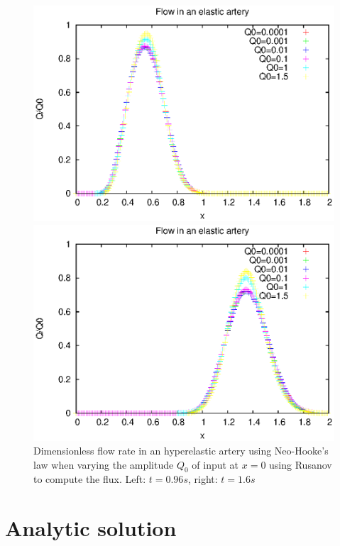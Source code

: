 \documentclass{config}
\begin{document}
\begin{figure}[H]
   \begin{minipage}[c]{.46\linewidth}
     \includegraphics[scale=0.7]{figures/Q_NH_t1.eps}
   \end{minipage} \hfill
   \begin{minipage}[c]{.46\linewidth}
\includegraphics[scale=0.7]{figures/Q_NH_t2.eps}
   \end{minipage}
   \caption{Dimensionless flow rate in an hyperelastic artery using Neo-Hooke's law when varying the amplitude $Q_0$ of input at $x=0$ using Rusanov to compute the flux. Left: $t=0.96 s$, right: $t=1.6s$}
   \label{Q_NH}
\end{figure}

\section{Analytic solution}
\end{document}
